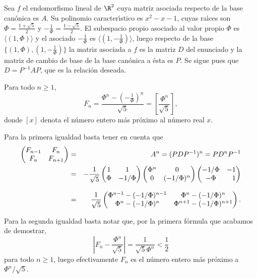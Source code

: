 \begin{demostracion}
Sea $f$ el endomorfismo lineal de $\R^2$ cuya matriz asociada respecto de la base can\'onica es $A$. Su polinomio caracter\'\i stico es $x^2-x-1$, cuyas ra\'\i ces son $\displaystyle\Phi=\frac{1+\sqrt 5}{2}$ y $\displaystyle -\frac{1}{\Phi}=\frac{1-\sqrt 5}{2}$. El subespacio propio asociado al valor propio $\Phi$ es $\langle (1,\Phi)\rangle$ y el asociado  $\displaystyle -\frac{1}{\Phi}$ es $\langle (1,\displaystyle -\frac{1}{\Phi})\rangle$, luego respecto de la base $\{ (1,\Phi),(1,\displaystyle -\frac{1}{\Phi})\}$ la matriz asociada a $f$ es la matriz $D$ del enunciado y la matriz de cambio de base de la base can\'onica a \'esta es $P$. Se sigue pues que $D=P^{-1}AP$, que es la relaci\'on deseada.
\end{demostracion}

\begin{corolario}\label{FormulaExplicita} Para todo $n\geq 1$,
$$F_n=\frac{\Phi^n-\left(-\displaystyle\frac{1}{\Phi}\right)^n}{\sqrt 5}=\left[\frac{\Phi^n}{\sqrt 5}\right],$$
donde $[x]$ denota el n\'umero entero m\'as pr\'oximo al n\'umero real $x$.
\end{corolario}

\begin{demostracion}
Para la primera igualdad basta tener en cuenta que
\begin{eqnarray*}
\begin{pmatrix} F_{n-1}&F_n\\ F_n&F_{n+1}\end{pmatrix} &=&
A^n=(PDP^{-1})^n=PD^nP^{-1}\\ &=&
-\frac{1}{\sqrt 5} \begin{pmatrix} 1&1\\ \Phi &-1/\Phi\end{pmatrix}
\begin{pmatrix} \Phi^n&0\\ 0&(-1/\Phi)^n\end{pmatrix}
\begin{pmatrix} -1/\Phi & -1\\
-\Phi & \phantom{-}1 \end{pmatrix} \\\rule{0mm}{0.8cm}
&=& \frac{1}{\sqrt 5}\begin{pmatrix}
\Phi^{n-1}-(-1/\Phi)^{n-1} & \Phi^n-(-1/\Phi)^n\\
\Phi^n-(-1/\Phi)^n & \Phi^{n+1}-(-1/\Phi)^{n+1} \end{pmatrix}.
\end{eqnarray*}

Para la segunda igualdad basta notar que, por la primera f\'ormula que acabamos de demostrar,
\begin{equation}\label{Desigualdad}\left| F_n-\frac{\Phi^n}{\sqrt 5}\right|=\frac{1}{\sqrt 5\Phi^n}<\frac{1}{2}\end{equation}
para todo $n\geq 1$, luego efectivamente $F_n$ es el n\'umero entero m\'as pr\'oximo a $\Phi^n/\sqrt 5$.
\end{demostracion}

